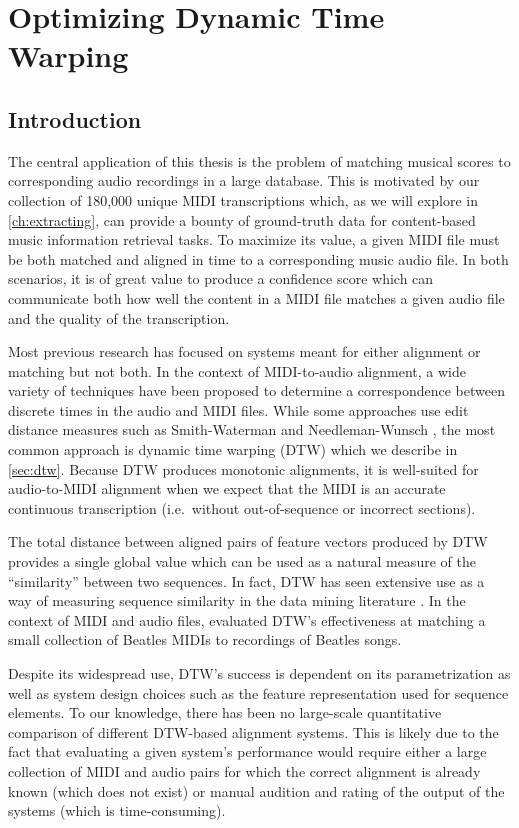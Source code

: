 \chapter{Optimizing Dynamic Time Warping}
\label{ch:dtw}

\section{Introduction}
\label{sec:intro}

The central application of this thesis is the problem of matching musical scores to corresponding audio recordings in a large database.
This is motivated by our collection of 180,000 unique MIDI transcriptions which, as we will explore in \cref{ch:extracting}, can provide a bounty of ground-truth data for content-based music information retrieval tasks.
To maximize its value, a given MIDI file must be both matched and aligned in time to a corresponding music audio file.
In both scenarios, it is of great value to produce a confidence score which can communicate both how well the content in a MIDI file matches a given audio file and the quality of the transcription.

Most previous research has focused on systems meant for either alignment or matching but not both.
In the context of MIDI-to-audio alignment, a wide variety of techniques have been proposed to determine a correspondence between discrete times in the audio and MIDI files.
While some approaches use edit distance measures such as Smith-Waterman \cite{ewert2012towards} and Needleman-Wunsch \cite{grachten2013automatic}, the most common approach is dynamic time warping (DTW) which we describe in \cref{sec:dtw}.
Because DTW produces monotonic alignments, it is well-suited for audio-to-MIDI alignment when we expect that the MIDI is an accurate continuous transcription (i.e.\ without out-of-sequence or incorrect sections).

The total distance between aligned pairs of feature vectors produced by DTW provides a single global value which can be used as a natural measure of the ``similarity'' between two sequences.
In fact, DTW has seen extensive use as a way of measuring sequence similarity in the data mining literature \cite{berndt1994using}.
In the context of MIDI and audio files, \cite{hu2003polyphonic} evaluated DTW's effectiveness at matching a small collection of Beatles MIDIs to recordings of Beatles songs.

Despite its widespread use, DTW's success is dependent on its parametrization as well as system design choices such as the feature representation used for sequence elements.
To our knowledge, there has been no large-scale quantitative comparison of different DTW-based alignment systems.
This is likely due to the fact that evaluating a given system's performance would require either a large collection of MIDI and audio pairs for which the correct alignment is already known (which does not exist) or manual audition and rating of the output of the systems (which is time-consuming).

